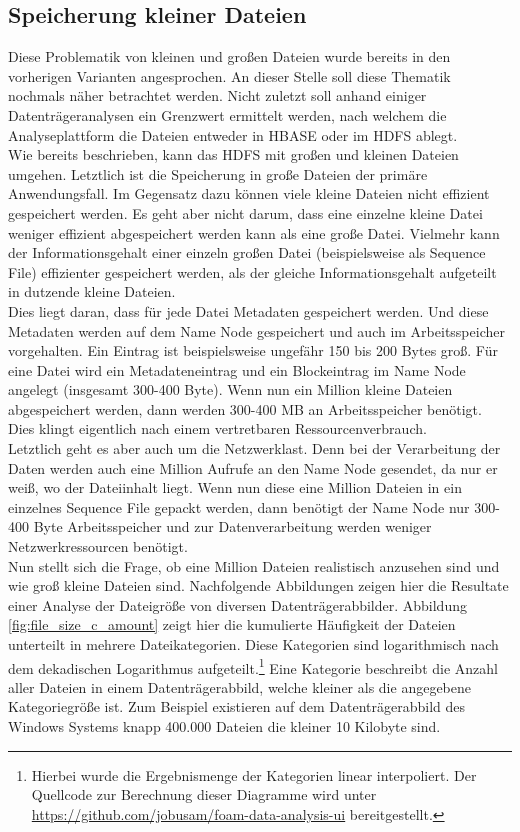\subsection{Speicherung kleiner Dateien} 
Diese Problematik von kleinen und großen Dateien wurde bereits in den vorherigen Varianten angesprochen. An dieser Stelle soll diese Thematik nochmals näher betrachtet werden. Nicht zuletzt soll anhand einiger Datenträgeranalysen ein Grenzwert ermittelt werden, nach welchem die Analyseplattform die Dateien entweder in HBASE oder im HDFS ablegt.\\

\noindent
Wie bereits beschrieben, kann das HDFS mit großen und kleinen Dateien umgehen. Letztlich ist die Speicherung in große Dateien der primäre Anwendungsfall. Im Gegensatz dazu können viele kleine Dateien nicht effizient gespeichert werden. Es geht aber nicht darum, dass eine einzelne kleine Datei weniger effizient abgespeichert werden kann als eine große Datei. Vielmehr kann der Informationsgehalt einer einzeln großen Datei (beispielsweise als Sequence File) effizienter gespeichert werden, als der gleiche Informationsgehalt aufgeteilt in dutzende kleine Dateien. \\
Dies liegt daran, dass für jede Datei Metadaten gespeichert werden. Und diese Metadaten werden auf dem Name Node gespeichert und auch im Arbeitsspeicher vorgehalten.\cite{hdfs_architecture} Ein Eintrag ist beispielsweise ungefähr 150 bis 200 Bytes groß. Für eine Datei wird ein Metadateneintrag und ein Blockeintrag im Name Node angelegt (insgesamt 300-400 Byte). Wenn nun ein Million kleine Dateien abgespeichert werden, dann werden 300-400 MB an Arbeitsspeicher benötigt. 
Dies klingt eigentlich nach einem vertretbaren Ressourcenverbrauch.\\

\noindent
Letztlich geht es aber auch um die Netzwerklast. Denn bei der Verarbeitung der Daten werden auch eine Million Aufrufe an den Name Node gesendet, da nur er weiß, wo der Dateiinhalt liegt. Wenn nun diese eine Million Dateien in ein einzelnes Sequence File gepackt werden, dann benötigt der Name Node nur 300-400 Byte Arbeitsspeicher und zur Datenverarbeitung werden weniger Netzwerkressourcen benötigt.\\

\noindent
Nun stellt sich die Frage, ob eine Million Dateien realistisch anzusehen sind und wie groß kleine Dateien sind. Nachfolgende Abbildungen zeigen hier die Resultate einer Analyse der Dateigröße von diversen Datenträgerabbilder. Abbildung \ref{fig:file_size_c_amount} zeigt hier die kumulierte Häufigkeit der Dateien unterteilt in mehrere Dateikategorien. Diese Kategorien sind logarithmisch nach dem dekadischen Logarithmus aufgeteilt.\footnote{Hierbei wurde die Ergebnismenge der Kategorien linear interpoliert. Der Quellcode zur Berechnung dieser Diagramme wird unter \url{https://github.com/jobusam/foam-data-analysis-ui} bereitgestellt. } Eine Kategorie beschreibt die Anzahl aller Dateien in einem Datenträgerabbild, welche kleiner als die angegebene Kategoriegröße ist. Zum Beispiel existieren auf dem Datenträgerabbild des Windows Systems knapp 400.000 Dateien die kleiner 10 Kilobyte sind.\\

